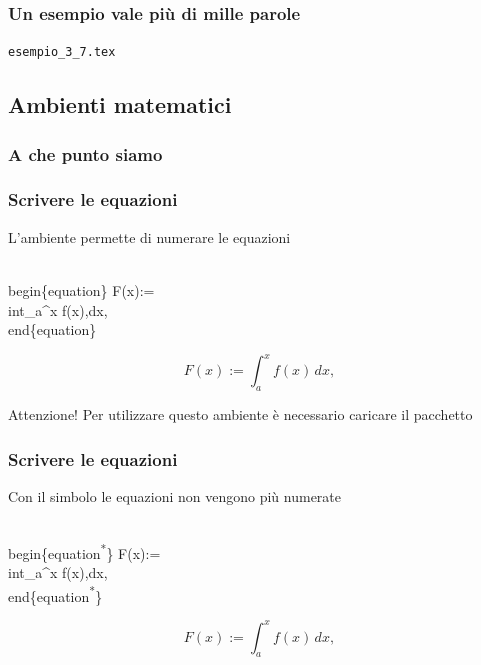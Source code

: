 \documentclass[svgnames,%
	ucs,%
	pdftex]{guitbeamer}
\begin{document}
\begin{frame}
  \frametitle{Un esempio vale pi\`u di mille parole}
	\begin{center}
		\alert{\texttt{esempio\_3\_7.tex}}
	\end{center}
\end{frame}
\subsection{Ambienti matematici}
\begin{frame}
  \frametitle{A che punto siamo}
\end{frame}
\begin{frame}
  \frametitle{Scrivere le equazioni}
	L'ambiente  permette di numerare le equazioni
	\begin{LaTeXcode}
		\alert{\\begin\{equation\}}\n
		\hspace*{5ex} F(x):= \\int\_a\textasciicircum x f(x)\bs,dx,\n
		\alert{\\end\{equation\}}
	\end{LaTeXcode}
	\begin{LaTeXoutput}
		\begin{equation}
			F(x):= \int_a^x f(x)\,dx,
		\end{equation}
	\end{LaTeXoutput}
	\begin{block}{Attenzione!}
		Per utilizzare questo ambiente \`e necessario caricare il pacchetto \Lsty{amsmath}
	\end{block}
\end{frame}
\begin{frame}
  \frametitle{Scrivere le equazioni}
	Con il simbolo \LCmd[]{\textsuperscript{*}} le equazioni non vengono pi\`u numerate
	\begin{LaTeXcode}
		\\begin\{equation\alert{\textsuperscript{*}}\}\n
		\hspace*{5ex} F(x):= \\int\_a\textasciicircum x f(x)\bs,dx,\n
		\\end\{equation\alert{\textsuperscript{*}}\}
	\end{LaTeXcode}
	\begin{LaTeXoutput}
		\begin{equation*}
			F(x):= \int_a^x f(x)\,dx,
		\end{equation*}
	\end{LaTeXoutput}
\end{frame}
\end{document}
